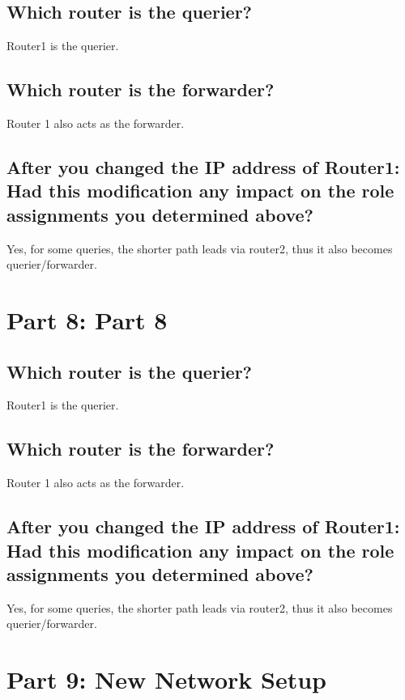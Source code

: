 \documentclass[a4paper, 11pt]{article}
\begin{document}
\subsection{Which router is the querier?}

Router1 is the querier.

\subsection{Which router is the forwarder?}

Router 1 also acts as the forwarder.

\subsection{After you changed the IP address of Router1: Had this modification any impact on the role assignments you determined above?}

Yes, for some queries, the shorter path leads via router2, thus it also becomes querier/forwarder.

\section{Part 8: Part 8}

\subsection{Which router is the querier?}

Router1 is the querier.

\subsection{Which router is the forwarder?}

Router 1 also acts as the forwarder.

\subsection{After you changed the IP address of Router1: Had this modification any impact on the role assignments you determined above?}

Yes, for some queries, the shorter path leads via router2, thus it also becomes querier/forwarder.

\section{Part 9: New Network Setup}
\end{document}
